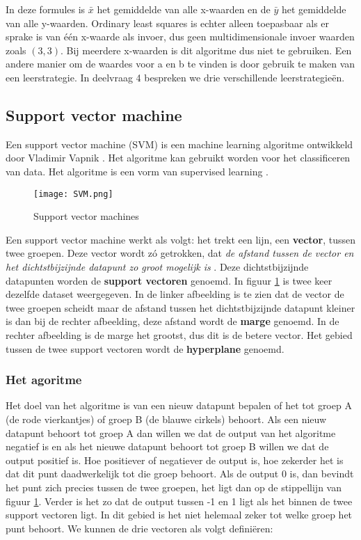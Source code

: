In deze formules is $\bar{x}$ het gemiddelde van alle x-waarden en de $\bar{y}$ het gemiddelde van alle y-waarden. 
Ordinary least squares is echter alleen toepasbaar als er sprake is van \'{e}\'{e}n x-waarde als invoer, dus geen multidimensionale invoer waarden zoals $(3,3)$. Bij meerdere x-waarden is dit algoritme dus niet te gebruiken. Een andere manier om de waardes voor a en b te vinden is door gebruik te maken van een leerstrategie. In deelvraag 4 bespreken we drie verschillende leerstrategie\"en.

\subsection{Support vector machine}
Een support vector machine (SVM) is een machine learning algoritme ontwikkeld door Vladimir Vapnik \cite{VladimirVapnik}. Het algoritme kan gebruikt worden voor het classificeren van data. Het algoritme is een vorm van supervised learning \cite{SVM}.

\begin{figure}[h]
  \centering
    \texttt{[image: SVM.png]}
  \caption{Support vector machines}
  \label{fig:SupVectorMachine1}
\end{figure}

Een support vector machine werkt als volgt: het trekt een lijn, een \textbf{vector}, tussen twee groepen. Deze vector wordt z\'o getrokken, dat \textit{de afstand tussen de vector en het dichtstbijzijnde datapunt zo groot mogelijk is} \cite{SVM2}. Deze dichtstbijzijnde datapunten worden de \textbf{support vectoren} genoemd. In figuur \ref{fig:SupVectorMachine1} is twee keer dezelfde dataset weergegeven. In de linker afbeelding is te zien dat de vector de twee groepen scheidt maar de afstand tussen het dichtstbijzijnde datapunt kleiner is dan bij de rechter afbeelding, deze afstand wordt de \textbf{marge} genoemd. In de rechter afbeelding is de marge het grootst, dus dit is de betere vector. Het gebied tussen de twee support vectoren wordt de \textbf{hyperplane} genoemd.

\subsubsection{Het agoritme}
Het doel van het algoritme is van een nieuw datapunt bepalen of het tot groep A (de rode vierkantjes) of groep B (de blauwe cirkels) behoort. Als een nieuw datapunt behoort tot groep A dan willen we dat de output van het algoritme negatief is en als het nieuwe datapunt behoort tot groep B willen we dat de output positief is. Hoe positiever of negatiever de output is, hoe zekerder het is dat dit punt daadwerkelijk tot die groep behoort. Als de output 0 is, dan bevindt het punt zich precies tussen de twee groepen, het ligt dan op de stippellijn van figuur \ref{fig:SupVectorMachine1}. Verder is het zo dat de output tussen -1 en 1 ligt als het binnen de twee support vectoren ligt. In dit gebied is het niet helemaal zeker tot welke groep het punt behoort. 
We kunnen de drie vectoren als volgt defini\"eren: 


